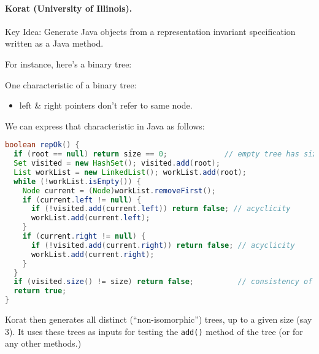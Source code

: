 \documentclass[11pt]{article}
\begin{document}
\paragraph{Korat (University of Illinois).}
Key Idea: Generate Java objects from a representation invariant specification
written as a Java method.

For instance, here's a binary tree: 

\begin{center}
\end{center}

One characteristic of a binary tree:
\begin{itemize}
\item left \& right pointers don't refer to same node.
\end{itemize}

\newpage
We can express that characteristic in Java as follows:
{\small \begin{lstlisting}[language=Java]
boolean repOk() {
  if (root == null) return size == 0; 	   	      // empty tree has size 0
  Set visited = new HashSet(); visited.add(root);
  List workList = new LinkedList(); workList.add(root);
  while (!workList.isEmpty()) {
    Node current = (Node)workList.removeFirst();
    if (current.left != null) {
      if (!visited.add(current.left)) return false; // acyclicity
      workList.add(current.left);
    }
    if (current.right != null) {
      if (!visited.add(current.right)) return false; // acyclicity
      workList.add(current.right);
    }
  }
  if (visited.size() != size) return false; 	     // consistency of size
  return true;
}
\end{lstlisting}
}

Korat then generates all distinct (``non-isomorphic'') trees, 
    up to a given size (say 3).
It uses these trees as inputs for testing 
    the {\tt add()} method of the tree (or for any other methods.)
\end{document}

